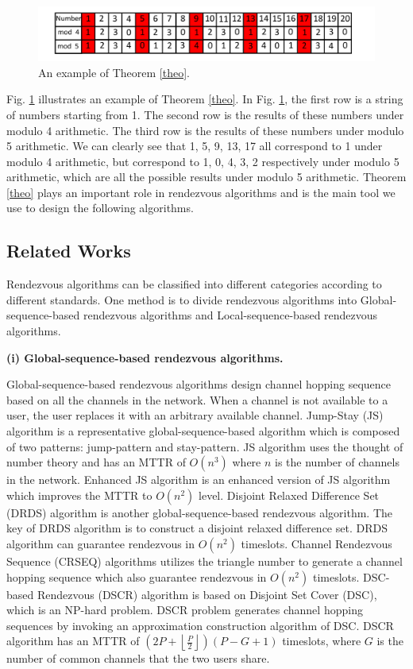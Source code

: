 \documentclass[10pt, conference, letterpaper]{IEEEtran}
\begin{document}
\begin{figure}[!t]
\centering
\includegraphics[width=1\columnwidth]{theo}
\caption{An example of Theorem \ref{theo}.}
\label{exp1}
\end{figure}

Fig. \ref{exp1} illustrates an example of Theorem \ref{theo}. In Fig. \ref{exp1}, the first row is a string of numbers starting from 1. The second row is the results of these numbers under modulo 4 arithmetic. The third row is the results of these numbers under modulo 5 arithmetic. We can clearly see that 1, 5, 9, 13, 17 all correspond to 1 under modulo 4 arithmetic, but correspond to 1, 0, 4, 3, 2 respectively under modulo 5 arithmetic, which are all the possible results under modulo 5 arithmetic. Theorem \ref{theo} plays an important role in rendezvous algorithms and is the main tool we use to design the following algorithms.

\subsection{Related Works}
Rendezvous algorithms can be classified into different categories according to different standards. One method is to divide rendezvous algorithms into Global-sequence-based rendezvous algorithms and Local-sequence-based rendezvous algorithms.

\bfseries (i) Global-sequence-based rendezvous algorithms. \mdseries

Global-sequence-based rendezvous algorithms design channel hopping sequence based on all the channels in the network. When a channel is not available to a user, the user replaces it with an arbitrary available channel. Jump-Stay (JS)\cite{Liu2012Jump} algorithm is a representative global-sequence-based algorithm which is composed of two patterns: jump-pattern and stay-pattern. JS algorithm uses the thought of number theory and has an MTTR of $O(n^3)$ where $n$ is the number of channels in the network. Enhanced JS \cite{Lin2013Enhanced}algorithm is an enhanced version of JS algorithm which improves the MTTR to $O(n^2)$ level. Disjoint Relaxed Difference Set (DRDS)\cite{Gu2013Nearly} algorithm is another global-sequence-based rendezvous algorithm. The key of DRDS algorithm is to construct a disjoint relaxed difference set. DRDS algorithm can guarantee rendezvous in $O(n^2)$ timeslots. Channel Rendezvous Sequence (CRSEQ)\cite{Shin2010A} algorithms utilizes the triangle number to generate a channel hopping sequence which also guarantee rendezvous in $O(n^2)$ timeslots.
DSC-based Rendezvous (DSCR)\cite{Yang2016A} algorithm is based on Disjoint Set Cover (DSC), which is an NP-hard problem. DSCR problem generates channel hopping sequences by invoking an approximation construction algorithm of DSC. DSCR algorithm has an MTTR of $(2P+\left \lfloor \frac{P}{2} \right \rfloor)(P-G+1)$ timeslots, where $G$ is the number of common channels that the two users share.
\end{document}
